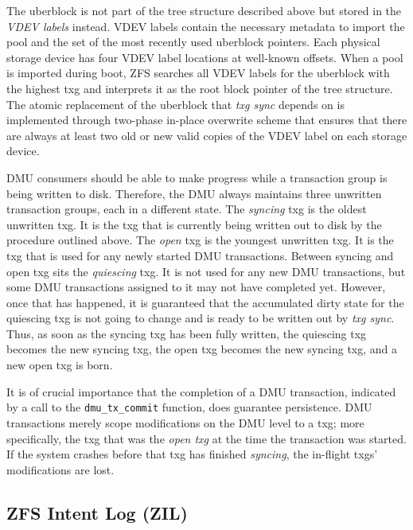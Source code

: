 \documentclass[12pt,a4paper,twoside]{book}
\begin{document}
The uberblock is not part of the tree structure described above but stored in the \textit{VDEV labels} instead.
VDEV labels contain the necessary metadata to import the pool and the set of the most recently used uberblock pointers.
Each physical storage device has four VDEV label locations at well-known offsets.
When a pool is imported during boot, ZFS searches all VDEV labels for the uberblock with the highest txg and interprets it as the root block pointer of the tree structure.
The atomic replacement of the uberblock that \textit{txg sync} depends on is implemented through two-phase in-place overwrite scheme that ensures that there are always at least two old or new valid copies of the VDEV label on each storage device.

DMU consumers should be able to make progress while a transaction group is being written to disk.
Therefore, the DMU always maintains three unwritten transaction groups, each in a different state.
The \textit{syncing} txg is the oldest unwritten txg.
It is the txg that is currently being written out to disk by the procedure outlined above.
The \textit{open} txg is the youngest unwritten txg.
It is the txg that is used for any newly started DMU transactions.
Between syncing and open txg sits the \textit{quiescing} txg.
It is not used for any new DMU transactions, but some DMU transactions assigned to it may not have completed yet.
However, once that has happened, it is guaranteed that the accumulated dirty state for the quiescing txg is not going to change and is ready to be written out by \textit{txg sync}.
Thus, as soon as the syncing txg has been fully written, the quiescing txg becomes the new syncing txg, the open txg becomes the new syncing txg, and a new open txg is born.

It is of crucial importance that the completion of a DMU transaction, indicated by a call to the \lstinline{dmu_tx_commit} function, does \underline{} guarantee persistence.
DMU transactions merely scope modifications on the DMU level to a txg; more specifically, the txg that was the \textit{open txg} at the time the transaction was started.
If the system crashes before that txg has finished \textit{syncing}, the in-flight txgs' modifications are lost.


\subsection{ZFS Intent Log (ZIL)}\label{openzfs:the_zil_api}
\end{document}
